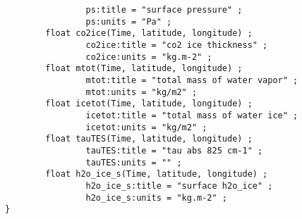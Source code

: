 {\begin{verbatim}
                ps:title = "surface pressure" ;
                ps:units = "Pa" ;
        float co2ice(Time, latitude, longitude) ;
                co2ice:title = "co2 ice thickness" ;
                co2ice:units = "kg.m-2" ;
        float mtot(Time, latitude, longitude) ;
                mtot:title = "total mass of water vapor" ;
                mtot:units = "kg/m2" ;
        float icetot(Time, latitude, longitude) ;
                icetot:title = "total mass of water ice" ;
                icetot:units = "kg/m2" ;
        float tauTES(Time, latitude, longitude) ;
                tauTES:title = "tau abs 825 cm-1" ;
                tauTES:units = "" ;
        float h2o_ice_s(Time, latitude, longitude) ;
                h2o_ice_s:title = "surface h2o_ice" ;
                h2o_ice_s:units = "kg.m-2" ;
}
\end{verbatim}
}
